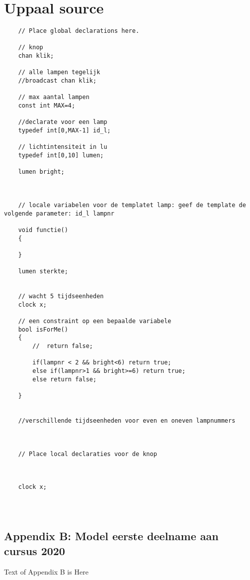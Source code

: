 \chapter{Uppaal source}
\label{appendix}
\thispagestyle{myheadings}



\begin{verbatim}
	// Place global declarations here.
	
	// knop 
	chan klik;
	
	// alle lampen tegelijk
	//broadcast chan klik;
	
	// max aantal lampen
	const int MAX=4;
	
	//declarate voor een lamp
	typedef int[0,MAX-1] id_l;
	
	// lichtintensiteit in lu
	typedef int[0,10] lumen;
	
	lumen bright;
	
	
	
	// locale variabelen voor de templatet lamp: geef de template de volgende parameter: id_l lampnr
	
	void functie()
	{
		
	}
	
	lumen sterkte;
	
	
	// wacht 5 tijdseenheden
	clock x;
	
	// een constraint op een bepaalde variabele
	bool isForMe()
	{
		//	return false;
		
		if(lampnr < 2 && bright<6) return true;
		else if(lampnr>1 && bright>=6) return true;
		else return false;
		
	}
	
	
	//verschillende tijdseenheden voor even en oneven lampnummers
	
	
	
	// Place local declaraties voor de knop
	
	
	
	clock x;
	
\end{verbatim}
\newpage

\section{\\ Appendix B: Model eerste deelname aan cursus 2020}

Text of Appendix B is Here



